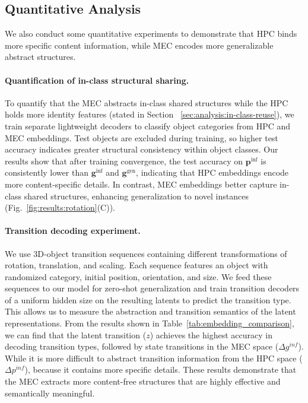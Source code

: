 \subsection{Quantitative Analysis}
We also conduct some quantitative experiments to demonstrate that HPC binds more specific content information, while MEC encodes more generalizable abstract structures. 

\vspace{-0.2cm}
\paragraph{Quantification of in-class structural sharing.} 
To quantify that the MEC abstracts in-class shared structures while the HPC holds more identity features (stated in Section ~\ref{sec:analysis:in-class-reuse}), we train separate lightweight decoders to classify object categories from HPC and MEC embeddings.  Test objects are excluded during training, so higher test accuracy indicates greater structural consistency within object classes. Our results show that after training convergence, the test accuracy on $\boldsymbol{p}^{\text{inf}}$ is consistently lower than $\boldsymbol{g}^{\text{inf}}$ and $\boldsymbol{g}^{\text{gen}}$, indicating that HPC embeddings encode more content-specific details. In contrast, MEC embeddings better capture in-class shared structures, enhancing generalization to novel instances (Fig.~\ref{fig:results:rotation}(C)).

\vspace{-0.2cm}
\paragraph{Transition decoding experiment.} 
\label{sec:analysis:quant-transition-decode}
We use 3D-object transition sequences containing different transformations of rotation, translation, and scaling. Each sequence features an object with randomized category, initial position, orientation, and size. We feed these sequences to our model for zero-shot generalization and train transition decoders of a uniform hidden size on the resulting latents to predict the transition type. This allows us to measure the abstraction and transition semantics of the latent representations.
From the results shown in Table~\ref{tab:embedding_comparison}, we can find that the latent transition ($z$) achieves the highest accuracy in decoding transition types, followed by state transitions in the MEC space ($\Delta g^{inf}$). While it is more difficult to abstract transition information from the HPC space ($\Delta p^{inf}$), because it contains more specific details. These results demonstrate that the MEC extracts more content-free structures that are highly effective and semantically meaningful.

